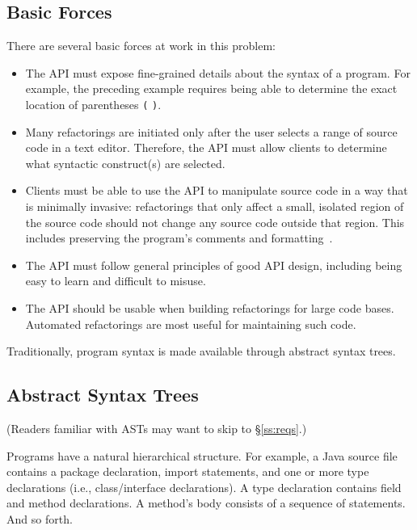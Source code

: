 \documentclass[prodmode]{acmlarge}
\newcommand{\ttt}[1]{\texttt{#1}}
\begin{document}
\subsection{Basic Forces}

There are several basic forces at work in this problem:

\begin{itemize}

\item The API must expose fine-grained details about the syntax of a program.
For example, the preceding example requires being able to determine the
exact location of parentheses \ttt{(} \ttt{)}.

\item Many refactorings are initiated only after the user selects a range of
source code in a text editor.  Therefore, the API must allow clients to
determine what syntactic construct(s) are selected.

\item Clients must be able to use the API to manipulate source code in a way
that is minimally invasive: refactorings that only affect a small, isolated
region of the source code should not change any source code outside that
region.  This includes preserving the program's comments and
formatting~\cite{sommerlad08retaining}.

\item The API must follow general principles of good API design, including
being easy to learn and difficult to misuse.

\item The API should be usable when building refactorings for large code bases.
Automated refactorings are most useful for maintaining such code.

\end{itemize}

Traditionally, program syntax is made available through abstract syntax trees.

\subsection{Abstract Syntax Trees}
\label{ss:asts}

(Readers familiar with ASTs may want to skip to \S\ref{ss:reqs}.)

Programs have a natural hierarchical structure.  For example, a Java source
file contains a package declaration, import statements, and one or more type
declarations (i.e., class/interface declarations).  A type declaration contains
field and method declarations.  A method's body consists of a sequence of
statements.  And so forth.
\end{document}
